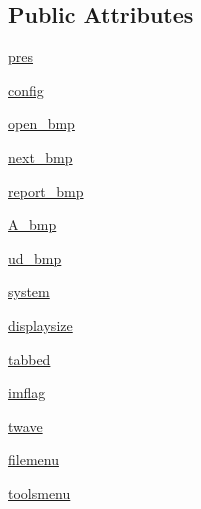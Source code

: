 \subsection*{Public Attributes}
\begin{DoxyCompactItemize}
\item 
\hyperlink{class_uni_dec_1_1unidec__modules_1_1mainwindow_1_1_mainwindow_a9a2c3b872537f33a0bc03109aac02f10}{pres}
\item 
\hyperlink{class_uni_dec_1_1unidec__modules_1_1mainwindow_1_1_mainwindow_adf6499eda6de1678facb8189124ceace}{config}
\item 
\hyperlink{class_uni_dec_1_1unidec__modules_1_1mainwindow_1_1_mainwindow_a5f2fd49314491c7553de0d6ece2fa4a4}{open\+\_\+bmp}
\item 
\hyperlink{class_uni_dec_1_1unidec__modules_1_1mainwindow_1_1_mainwindow_ab9068f1524d6f072e82e42ed65df682f}{next\+\_\+bmp}
\item 
\hyperlink{class_uni_dec_1_1unidec__modules_1_1mainwindow_1_1_mainwindow_a7cc47d0dc68802e6a239a7f24538bd9f}{report\+\_\+bmp}
\item 
\hyperlink{class_uni_dec_1_1unidec__modules_1_1mainwindow_1_1_mainwindow_abb41fea0cfaf184f1d91bbaeeb6111e4}{A\+\_\+bmp}
\item 
\hyperlink{class_uni_dec_1_1unidec__modules_1_1mainwindow_1_1_mainwindow_a6685c55b42c167bc2be2cfdcbbdf878b}{ud\+\_\+bmp}
\item 
\hyperlink{class_uni_dec_1_1unidec__modules_1_1mainwindow_1_1_mainwindow_a6823b9ade7633e1273b6c661a7f410bd}{system}
\item 
\hyperlink{class_uni_dec_1_1unidec__modules_1_1mainwindow_1_1_mainwindow_a0ee41f3a9c27f061c6aff1181cb5cdaf}{displaysize}
\item 
\hyperlink{class_uni_dec_1_1unidec__modules_1_1mainwindow_1_1_mainwindow_a7652739e5fb6806bb7979175cfa6fd05}{tabbed}
\item 
\hyperlink{class_uni_dec_1_1unidec__modules_1_1mainwindow_1_1_mainwindow_a35c9dc0aca94a4dc0caee4430a6aa1c5}{imflag}
\item 
\hyperlink{class_uni_dec_1_1unidec__modules_1_1mainwindow_1_1_mainwindow_a4b13dd81970539f7e189d0c2886640ba}{twave}
\item 
\hyperlink{class_uni_dec_1_1unidec__modules_1_1mainwindow_1_1_mainwindow_a6d76279ce6694f5f0a1935991f8c3f49}{filemenu}
\item 
\hyperlink{class_uni_dec_1_1unidec__modules_1_1mainwindow_1_1_mainwindow_a717f29a85576ec03a4255752bb79c0dd}{toolsmenu}
\item 

\end{DoxyCompactItemize}
